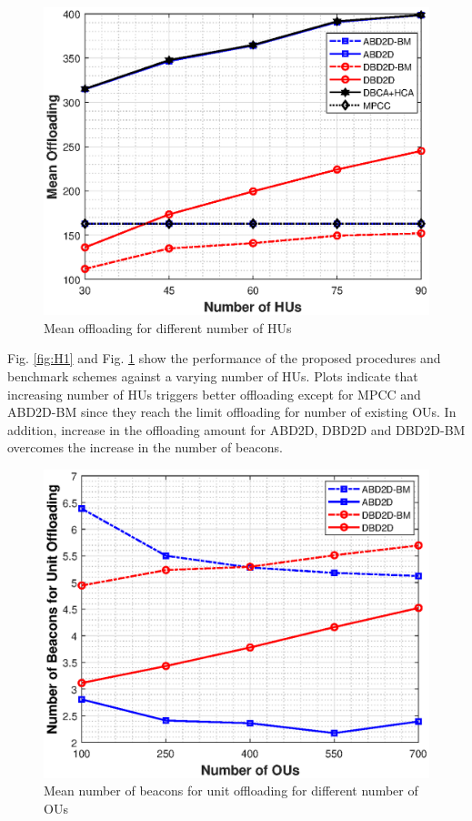 \documentclass[10pt,a4paper,twocolumn]{article}
\begin{document}
\begin{figure}[!htb]
	\centering
	
	\includegraphics[width=\columnwidth]{H2.eps}
	\caption{Mean offloading for different number of HUs}
	\label{fig:H2}
\end{figure}
Fig. \ref{fig:H1} and Fig. \ref{fig:H2} show the performance of the proposed procedures and benchmark schemes against a varying number of HUs. Plots indicate that increasing number of HUs triggers better offloading except for MPCC and ABD2D-BM since they reach the limit offloading for number of existing OUs. In addition, increase in the offloading amount for ABD2D, DBD2D and DBD2D-BM overcomes the increase in the number of beacons.

\begin{figure}[!htb]
	\centering
	
	\includegraphics[width=\columnwidth]{OU1.eps}
	\caption{Mean number of beacons for unit offloading for different number of OUs}
	\label{fig:O1}
\end{figure}
\end{document}
